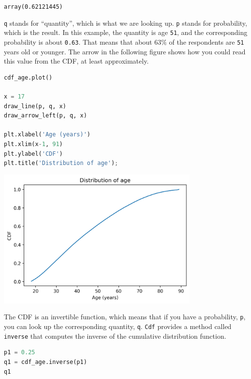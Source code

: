 \begin{lstlisting}[style=output]
array(0.62121445)
\end{lstlisting}

\passthrough{\lstinline!q!} stands for ``quantity'', which is what we
are looking up. \passthrough{\lstinline!p!} stands for probability,
which is the result. In this example, the quantity is age
\passthrough{\lstinline!51!}, and the corresponding probability is about
\passthrough{\lstinline!0.63!}. That means that about \(63\%\) of the
respondents are \passthrough{\lstinline!51!} years old or younger. The
arrow in the following figure shows how you could read this value from
the CDF, at least approximately.

\begin{lstlisting}[language=Python,style=source]
cdf_age.plot()

x = 17
draw_line(p, q, x)
draw_arrow_left(p, q, x)

plt.xlabel('Age (years)')
plt.xlim(x-1, 91)
plt.ylabel('CDF')
plt.title('Distribution of age');
\end{lstlisting}

\begin{center}
\includegraphics[width=4in]{chapters/08_distributions_files/08_distributions_66_0.png}
\end{center}

The CDF is an invertible function, which means that if you have a
probability, \passthrough{\lstinline!p!}, you can look up the
corresponding quantity, \passthrough{\lstinline!q!}.
\passthrough{\lstinline!Cdf!} provides a method called
\passthrough{\lstinline!inverse!} that computes the inverse of the
cumulative distribution function.

\begin{lstlisting}[language=Python,style=source]
p1 = 0.25
q1 = cdf_age.inverse(p1)
q1
\end{lstlisting}

